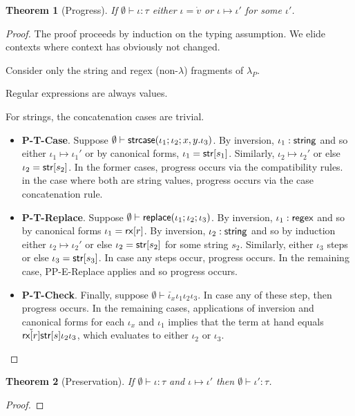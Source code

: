 \documentclass[11pt,leqno]{article}
\newtheorem{thm}{Theorem}
\theoremstyle{definition}
\newcommand{\lambdap}{\lambda_P}
\renewcommand{\tstr}[1]{{{\sf str}[#1]}}
\newcommand{\preplace}[3]{{\sf replace}(#1;#2;#3)}
\newcommand{\rx}[1]{ {\sf rx}[#1] }
\newcommand{\str}{{\sf string}}
\newcommand{\regex}{{\sf regex}}
\newcommand{\pstrcase}[3]{ {\sf strcase}(#1; #2; #3)}
\begin{document}
\begin{thm}[Progress]
If $\emptyset\vdash \iota : \tau$ either $\iota = \dot{v}$ or $\iota \mapsto \iota'$ for some $\iota'$.
\end{thm}
\begin{proof}
The proof proceeds by induction on the typing assumption. We elide contexts where context has obviously not changed.

Consider only the string and regex (non-$\lambda$) fragments of $\lambdap$.

Regular expressions are always values.

For strings, the concatenation cases are trivial.

\begin{itemize}[label=$ $,itemsep=1ex]

\item \textbf{P-T-Case}.
Suppose $\emptyset \vdash \pstrcase{\iota_1}{\iota_2}{x,y.\iota_3}$.
By inversion, $\iota_1 : \str$ and so either $\iota_1 \mapsto \iota_1'$
or by canonical forms, $\iota_1 = \tstr{s_1}$.
Similarly, $\iota_2 \mapsto \iota_2'$ or else $\iota_2 = \tstr{s_2}$.
In the former cases, progress occurs via the compatibility rules.
in the case where both are string values, progress occurs via the case concatenation rule.

\item \textbf{P-T-Replace}.
Suppose $\emptyset \vdash \preplace{\iota_1}{\iota_2}{\iota_3}$.
By inversion, $\iota_1 : \regex$ and so by canonical forms $\iota_1 = \rx{r}$.
By inversion, $\iota_2 : \str$ and so by induction either $\iota_2 \mapsto \iota_2'$
or else $\iota_2 = \tstr{s_2}$ for some string $s_2$.
Similarly, either $\iota_3$ steps or else $\iota_3 = \tstr{s_3}$.
In case any steps occur, progress occurs. In the remaining case,
PP-E-Replace applies and so progress occurs.

\item \textbf{P-T-Check}.
Finally, suppose $\emptyset \vdash \check{\iota_x}{\iota_1}{\iota_2}{\iota_3}$.
In case any of these step, then progress occurs.
In the remaining cases, applications of inversion and canonical forms for each
$\iota_x$ and $\iota_1$ implies that the term at hand equals $\check{\rx{r}}{\tstr{s}}{\iota_2}{\iota_3}$,
which evaluates to either $\iota_2$ or $\iota_3$.

\end{itemize}
\end{proof}

\begin{thm}[Preservation]
If $\emptyset \vdash \iota : \tau$ and $\iota \mapsto \iota'$ then $\emptyset \vdash \iota' : \tau$.
\end{thm}
\begin{proof}
\end{proof}
\end{document}
